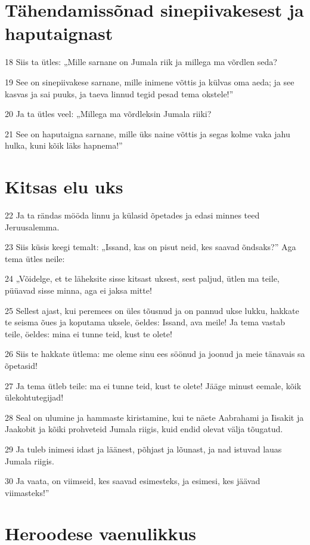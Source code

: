 \section*{Tähendamissõnad sinepiivakesest ja haputaignast}

\par 18 Siis ta ütles: „Mille sarnane on Jumala riik ja millega ma võrdlen seda?
\par 19 See on sinepiivakese sarnane, mille inimene võttis ja külvas oma aeda; ja see kasvas ja sai puuks, ja taeva linnud tegid pesad tema okstele!”
\par 20 Ja ta ütles veel: „Millega ma võrdleksin Jumala riiki?
\par 21 See on haputaigna sarnane, mille üks naine võttis ja segas kolme vaka jahu hulka, kuni kõik läks hapnema!”

\section*{Kitsas elu uks}

\par 22 Ja ta rändas mööda linnu ja külasid õpetades ja edasi minnes teed Jeruusalemma.
\par 23 Siis küsis keegi temalt: „Issand, kas on pisut neid, kes saavad õndsaks?” Aga tema ütles neile:
\par 24 „Võidelge, et te läheksite sisse kitsast uksest, sest paljud, ütlen ma teile, püüavad sisse minna, aga ei jaksa mitte!
\par 25 Sellest ajast, kui peremees on üles tõusnud ja on pannud ukse lukku, hakkate te seisma õues ja koputama uksele, öeldes: Issand, ava meile! Ja tema vastab teile, öeldes: mina ei tunne teid, kust te olete!
\par 26 Siis te hakkate ütlema: me oleme sinu ees söönud ja joonud ja meie tänavais sa õpetasid!
\par 27 Ja tema ütleb teile: ma ei tunne teid, kust te olete! Jääge minust eemale, kõik ülekohtutegijad!
\par 28 Seal on ulumine ja hammaste kiristamine, kui te näete Aabrahami ja Iisakit ja Jaakobit ja kõiki prohveteid Jumala riigis, kuid endid olevat välja tõugatud.
\par 29 Ja tuleb inimesi idast ja läänest, põhjast ja lõunast, ja nad istuvad lauas Jumala riigis.
\par 30 Ja vaata, on viimseid, kes saavad esimesteks, ja esimesi, kes jäävad viimasteks!”

\section*{Heroodese vaenulikkus}

